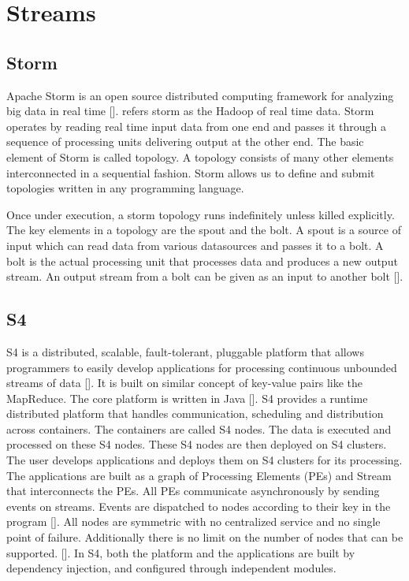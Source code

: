 \section{Streams}
\label{S:o-streams}

\subsection{Storm}

Apache Storm is an open source distributed computing framework for
analyzing big data in real time [\cite{storm-paper-IJCTT}]. refers storm
as the Hadoop of real time data. Storm operates by reading real time
input data from one end and passes it through a sequence of processing
units delivering output at the other end. The basic element of Storm
is called topology. A topology consists of many other elements
interconnected in a sequential fashion. Storm allows us to define and
submit topologies written in any programming language.

Once under execution, a storm topology runs indefinitely unless killed
explicitly. The key elements in a topology are the spout and the
bolt. A spout is a source of input which can read data from various
datasources and passes it to a bolt. A bolt is the actual processing
unit that processes data and produces a new output stream. An output
stream from a bolt can be given as an input to another
bolt [\cite{www-storm-home-concepts}].
     
\subsection{S4}


S4 is a distributed, scalable, fault-tolerant, pluggable platform that
allows programmers to easily develop applications for processing
continuous unbounded streams of data [\cite{www-s4}]. It is built on
similar concept of key-value pairs like the MapReduce. The core
platform is written in Java [\cite{www-s4-overview}]. S4 provides a
runtime distributed platform that handles communication, scheduling
and distribution across containers. The containers are called S4
nodes. The data is executed and processed on these S4 nodes. These S4
nodes are then deployed on S4 clusters. The user develops applications
and deploys them on S4 clusters for its processing. The applications
are built as a graph of Processing Elements (PEs) and Stream that
interconnects the PEs. All PEs communicate asynchronously by sending
events on streams. Events are dispatched to nodes according to their
key in the program [\cite{www-s4}]. All nodes are symmetric with no
centralized service and no single point of failure. Additionally there
is no limit on the number of nodes that can be
supported. [\cite{www-wiki-s4}]. In S4, both the platform and the
applications are built by dependency injection, and configured through
independent modules.

